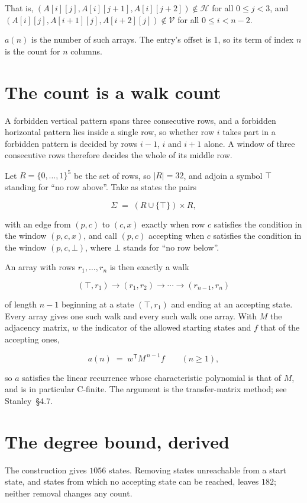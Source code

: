 \documentclass[11pt]{article}
\theoremstyle{definition}
\begin{document}
That is, $(A[i][j],A[i][j{+}1],A[i][j{+}2]) \notin \mathcal{H}$ for all $0 \le j < 3$, and $(A[i][j],A[i{+}1][j],A[i{+}2][j]) \notin \mathcal{V}$ for all $0 \le i < n-2$.

$a(n)$ is the number of such arrays. The entry's offset is 1, so its term of index $n$ is the count for $n$ columns.

\section{The count is a walk count}

A forbidden vertical pattern spans three consecutive rows, and a forbidden horizontal pattern lies inside a single row, so whether row $i$ takes part in a forbidden pattern is decided by rows $i-1$, $i$ and $i+1$ alone. A window of three consecutive rows therefore decides the whole of its middle row.

Let $R = \{0,\dots,1\}^{5}$ be the set of rows, so $|R| = 32$, and adjoin a symbol $\top$ standing for ``no row above''. Take as states the pairs

\[\Sigma \;=\; (R \cup \{\top\}) \times R,\]

with an edge from $(p,c)$ to $(c,x)$ exactly when row $c$ satisfies the condition in the window $(p,c,x)$, and call $(p,c)$ accepting when $c$ satisfies the condition in the window $(p,c,\bot)$, where $\bot$ stands for ``no row below''.

An array with rows $r_1,\dots,r_n$ is then exactly a walk

\[(\top,r_1) \to (r_1,r_2) \to \cdots \to (r_{n-1},r_n)\]

of length $n-1$ beginning at a state $(\top,r_1)$ and ending at an accepting state. Every array gives one such walk and every such walk one array. With $M$ the adjacency matrix, $w$ the indicator of the allowed starting states and $f$ that of the accepting ones,

\[a(n) \;=\; w^{\mathsf T} M^{\,n-1} f \qquad (n \ge 1),\]

so $a$ satisfies the linear recurrence whose characteristic polynomial is that of $M$, and is in particular C-finite. The argument is the transfer-matrix method; see Stanley~\S4.7.

\section{The degree bound, derived}

The construction gives $1056$ states. Removing states unreachable from a start state, and states from which no accepting state can be reached, leaves $182$; neither removal changes any count.
\end{document}
